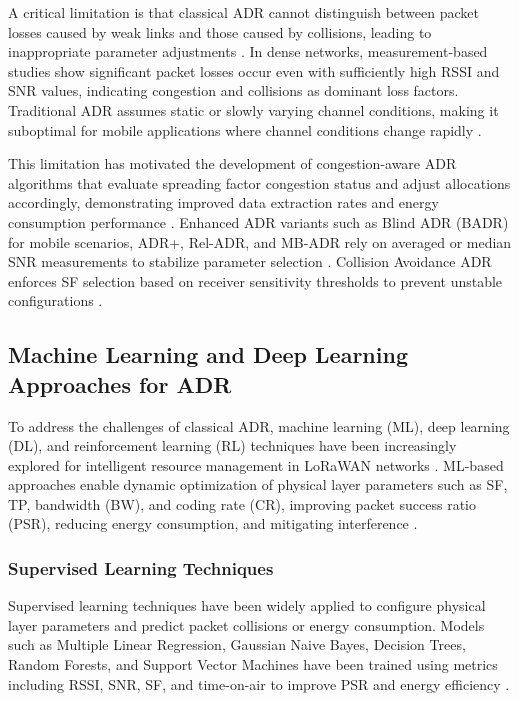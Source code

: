 \documentclass[12pt,a4paper]{article}
\begin{document}
A critical limitation is that classical ADR cannot distinguish between packet losses caused by weak links and those caused by collisions, leading to inappropriate parameter adjustments \cite{Liu-characterizing}. In dense networks, measurement-based studies show significant packet losses occur even with sufficiently high RSSI and SNR values, indicating congestion and collisions as dominant loss factors. Traditional ADR assumes static or slowly varying channel conditions, making it suboptimal for mobile applications where channel conditions change rapidly \cite{alGumaei2022ANovelApproach}.

This limitation has motivated the development of congestion-aware ADR algorithms that evaluate spreading factor congestion status and adjust allocations accordingly, demonstrating improved data extraction rates and energy consumption performance \cite{Finnegan2020adr}. Enhanced ADR variants such as Blind ADR (BADR) for mobile scenarios, ADR+, Rel-ADR, and MB-ADR rely on averaged or median SNR measurements to stabilize parameter selection \cite{Finnegan2020adr}. Collision Avoidance ADR enforces SF selection based on receiver sensitivity thresholds to prevent unstable configurations \cite{Kufakunesu2024}.

\subsection{Machine Learning and Deep Learning Approaches for ADR}

To address the challenges of classical ADR, machine learning (ML), deep learning (DL), and reinforcement learning (RL) techniques have been increasingly explored for intelligent resource management in LoRaWAN networks \cite{FarhadPyun2023, Farhad23-LoRaWAN-Meets-ML, Finnegan2020adr, Djoudi2022mdp}. ML-based approaches enable dynamic optimization of physical layer parameters such as SF, TP, bandwidth (BW), and coding rate (CR), improving packet success ratio (PSR), reducing energy consumption, and mitigating interference \cite{Farhad23-LoRaWAN-Meets-ML}.

\subsubsection{Supervised Learning Techniques}

Supervised learning techniques have been widely applied to configure physical layer parameters and predict packet collisions or energy consumption. Models such as Multiple Linear Regression, Gaussian Naive Bayes, Decision Trees, Random Forests, and Support Vector Machines have been trained using metrics including RSSI, SNR, SF, and time-on-air to improve PSR and energy efficiency \cite{Zholamanov2024, Farhad23-LoRaWAN-Meets-ML}.
\end{document}
